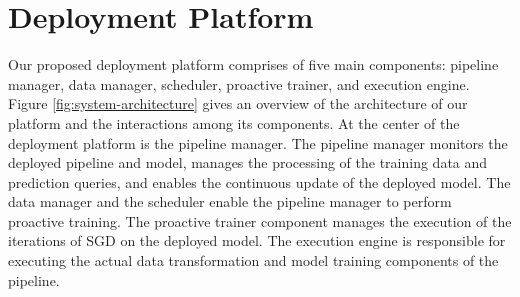 \section{Deployment Platform} \label{sec:system-architecture}
Our proposed deployment platform comprises of five main components: pipeline manager, data manager, scheduler, proactive trainer, and execution engine.
Figure \ref{fig:system-architecture} gives an overview of the architecture of our platform and the interactions among its components.
At the center of the deployment platform is the pipeline manager.
The pipeline manager monitors the deployed pipeline and model, manages the processing of the training data and prediction queries, and enables the continuous update of the deployed model.
The data manager and the scheduler enable the pipeline manager to perform proactive training.
The proactive trainer component manages the execution of the iterations of SGD on the deployed model.
The execution engine is responsible for executing the actual data transformation and model training components of the pipeline.

